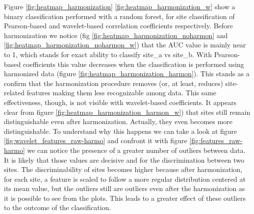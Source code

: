 \documentclass[11pt]{report}
\begin{document}
Figure \ref{fig:heatmap_harmonization} \ref{fig:heatmap_harmonization_w} show a binary classification performed with a random forest, for site classification of Pearson-based and wavelet-based correlation coefficients respectively.
Before harmonization we notice (fig \ref{fig:heatmap_harmonization_noharmon} and \ref{fig:heatmap_harmonization_noharmon_w}) that the AUC value is mainly near to 1, which stands for exact ability to classify site\_a vs site\_b.
With Pearson-based coefficients this value decreases when the classification is performed using harmonized data (figure \ref{fig:heatmap_harmonization_harmon}).
This stands as a confirm that the harmonization procedure removes (or, at least, reduces) site-related features making them less recognizable among data.
This same effectiveness, though, is not visible with wavelet-based coefficients.
It appears clear from figure \ref{fig:heatmap_harmonization_harmon_w}) that sites still remain distinguishable even after harmonization.
Actually, they even becomes more distinguishable. To understand why this happens we can take a look at figure \ref{fig:wavelet_features_raw-harmo} and confront it with figure \ref{fig:features_raw-harmo} we can notice the presence of a greater number of outliers between data.
It is likely that those values are decisive and for the discrimination between two sites.
The discriminability of sites becomes higher because after harmonization,  for each site, a feature is scaled to follow a more regular distribution centered at its mean value, but the outliers still are outliers even after the harmonization as it is possible to see from the plots.
This leads to a greater effect of these outliers to the outcome of the classification.


\end{document}
